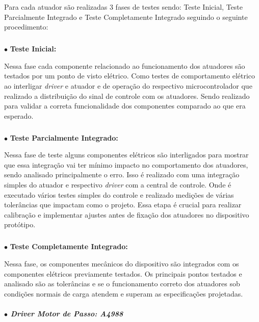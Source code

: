 Para cada atuador são realizadas 3 fases de testes sendo: Teste Inicial, Teste Parcialmente Integrado e Teste Completamente Integrado seguindo o seguinte procedimento:


\subparagraph*{} $\bullet$ \textbf{Teste Inicial:}
    
Nessa fase cada componente relacionado ao funcionamento dos atuadores são testados por um ponto de visto elétrico. Como testes de comportamento elétrico ao interligar \textit{driver} e atuador e de operação do respectivo microcontrolador que realizado a distribuição do sinal de controle com os atuadores. Sendo realizado para validar a correta funcionalidade dos componentes comparado ao que era esperado.
    
\newpage
    
\subparagraph*{} $\bullet$ \textbf{Teste Parcialmente Integrado:} \hfill 

Nessa fase de teste alguns componentes elétricos são interligados para mostrar que essa integração vai ter mínimo impacto no comportamento dos atuadores, sendo analisado principalmente o erro. Isso é realizado com uma integração simples do atuador e respectivo \textit{driver} com a central de controle. Onde é executado vários testes simples do controle e realizado medições de várias tolerâncias que impactam como o projeto. Essa etapa é crucial para realizar calibração e implementar ajustes antes de fixação dos atuadores no dispositivo protótipo.
    
\subparagraph*{} $\bullet$ \textbf{Teste Completamente Integrado:} \hfill

Nessa fase, os componentes mecânicos do dispositivo são integrados com os componentes elétricos previamente testados. Os principais pontos testados e analisado são as tolerâncias e se o funcionamento correto dos atuadores sob condições normais de carga atendem e superam as especificações projetadas. 



\subparagraph*{$\bullet$ \textit{Driver} Motor de Passo: A4988} \hfill

